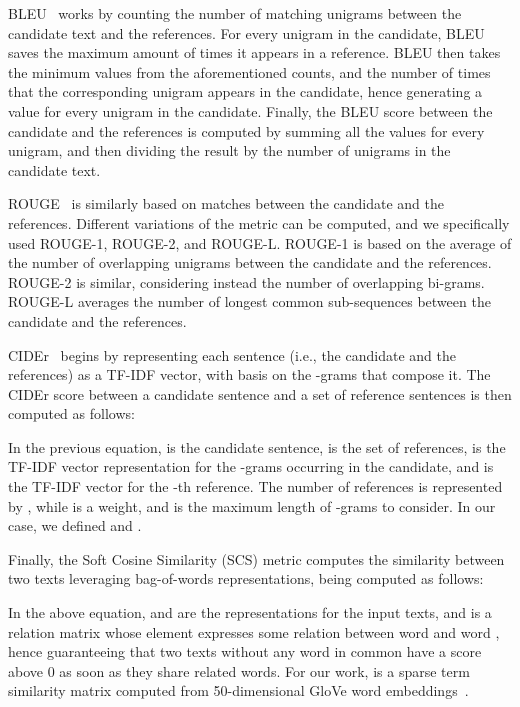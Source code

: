 BLEU~\cite{bleu} works by counting the number of matching unigrams between the candidate text and the references. For every unigram in the candidate, BLEU saves the maximum amount of times it appears in a reference. BLEU then takes the minimum values from the aforementioned counts, and the number of times that the corresponding unigram appears in the candidate, hence generating a value  for every unigram in the candidate. Finally, the BLEU score between the candidate and the references is computed by summing all the  values for every unigram, and then dividing the result by the number of unigrams in the candidate text.

ROUGE~\cite{rouge} is similarly based on matches between the candidate and the references. Different variations of the metric can be computed, and we specifically used ROUGE-1, ROUGE-2, and ROUGE-L. ROUGE-1 is based on the average of the number of overlapping unigrams between the candidate and the references. ROUGE-2 is similar, considering instead the number of overlapping bi-grams. ROUGE-L averages the number of longest common sub-sequences between the candidate and the references.

CIDEr~\cite{cider} begins by representing each sentence (i.e., the candidate and the references) as a TF-IDF vector, with basis on the -grams that compose it. The CIDEr score between a candidate sentence and a set of reference sentences is then computed as follows:



In the previous equation,  is the candidate sentence,  is the set of references,   is the TF-IDF vector representation for the -grams occurring in the candidate, and  is the TF-IDF vector for the -th reference. The number of references is represented by , while  is a weight, and  is the maximum length of -grams to consider. In our case, we defined  and .

Finally, the Soft Cosine Similarity (SCS) metric computes the similarity between two texts leveraging bag-of-words representations, being computed as follows:



In the above equation,  and  are the representations for the input texts, and  is a relation matrix whose element  expresses some relation between word  and word , hence guaranteeing that two texts without any word in common have a score above 0 as soon as they share related words. For our work,  is a sparse term similarity matrix computed from 50-dimensional GloVe word embeddings~\cite{glove}.

